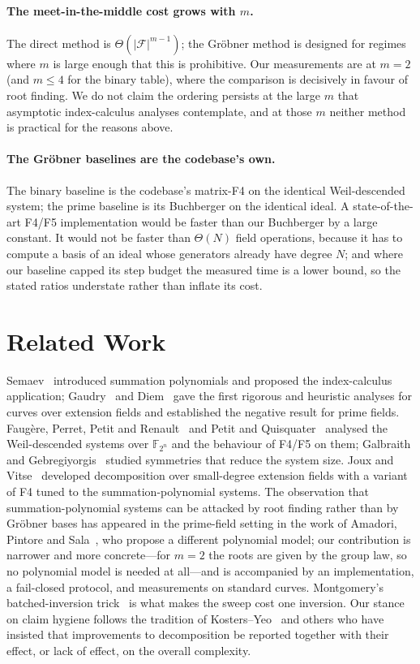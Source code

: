 \documentclass[10pt,a4paper]{article}
\theoremstyle{remark}
\newcommand{\FF}{\mathbb{F}}
\newcommand{\Fb}{\mathcal{F}}
\newcommand{\abs}[1]{\lvert #1 \rvert}
\begin{document}
\paragraph{The meet-in-the-middle cost grows with $m$.} The direct
method is $\Theta(\abs{\Fb}^{m-1})$; the Gr\"obner method is designed
for regimes where $m$ is large enough that this is prohibitive. Our
measurements are at $m = 2$ (and $m \le 4$ for the binary table), where
the comparison is decisively in favour of root finding. We do not claim
the ordering persists at the large $m$ that asymptotic index-calculus
analyses contemplate, and at those $m$ neither method is practical for
the reasons above.

\paragraph{The Gr\"obner baselines are the codebase's own.} The binary
baseline is the codebase's matrix-F4 on the identical Weil-descended
system; the prime baseline is its Buchberger on the identical ideal. A
state-of-the-art F4/F5 implementation would be faster than our
Buchberger by a large constant. It would not be faster than $\Theta(N)$
field operations, because it has to compute a basis of an ideal whose
generators already have degree $N$; and where our baseline capped its
step budget the measured time is a lower bound, so the stated ratios
understate rather than inflate its cost.

\section{Related Work}
\label{sec:related}

Semaev~\cite{semaev2004} introduced summation polynomials and proposed
the index-calculus application; Gaudry~\cite{gaudry2009} and
Diem~\cite{diem2011} gave the first rigorous and heuristic analyses for
curves over extension fields and established the negative result for
prime fields. Faug\`ere, Perret, Petit and Renault~\cite{fppr2012} and
Petit and Quisquater~\cite{petitquisquater2012} analysed the
Weil-descended systems over $\FF_{2^n}$ and the behaviour of F4/F5 on
them; Galbraith and Gebregiyorgis~\cite{galbraithgebregiyorgis2014}
studied symmetries that reduce the system size. Joux and
Vitse~\cite{jouxvitse2013} developed decomposition over small-degree
extension fields with a variant of F4 tuned to the summation-polynomial
systems. The observation that summation-polynomial systems can be
attacked by root finding rather than by Gr\"obner bases has appeared in
the prime-field setting in the work of Amadori, Pintore and
Sala~\cite{amadoripintoresala2018}, who propose a different polynomial
model; our contribution is narrower and more concrete---for $m = 2$ the
roots are given by the group law, so no polynomial model is needed at
all---and is accompanied by an implementation, a fail-closed protocol,
and measurements on standard curves. Montgomery's batched-inversion
trick~\cite{montgomery1987} is what makes the sweep cost one inversion.
Our stance on claim hygiene follows the tradition of
Kosters--Yeo~\cite{kostersyeo2015} and others who have insisted that
improvements to decomposition be reported together with their effect,
or lack of effect, on the overall complexity.
\end{document}
